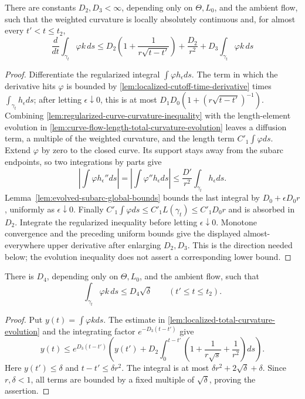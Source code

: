 \begin{theorem}
\label{lem:localized-total-curvature-evolution}
\notready
There are constants $D_2,D_3<\infty$, depending only on
$\Theta,L_0$, and the ambient flow, such that the weighted curvature is
locally absolutely continuous and, for almost every $t' < t\le t_2$,
\[
 \frac d{dt}\int_{\gamma_t}\varphi k\,ds
 \le D_2\left(1+\frac1{r\sqrt{t-t'}}\right)+\frac{D_2}{r^2}
       +D_3\int_{\gamma_t}\varphi k\,ds
\]
\end{theorem}
\begin{proof}
Differentiate the regularized integral
$\int\varphi h_\epsilon ds$.  The term in which the derivative hits
$\varphi$ is bounded by \ref{lem:localized-cutoff-time-derivative} times
$\int_{\gamma_t}h_\epsilon ds$; after letting $\epsilon\downarrow0$, this
is at most $D_1D_0(1+(r\sqrt{t-t'})^{-1})$.  Combining
\ref{lem:regularized-curve-curvature-inequality} with the length-element
evolution in \ref{lem:curve-flow-length-total-curvature-evolution} leaves a
diffusion term, a multiple of the weighted curvature, and the length term
$C'_1\int\varphi ds$.  Extend $\varphi$ by zero to the closed curve.  Its
support stays away from the subarc endpoints, so two integrations by parts
give
\[
 \left|\int\varphi h_\epsilon''ds\right|
 =\left|\int\varphi''h_\epsilon ds\right|
 \le\frac{D'}{r^2}\int_{\gamma_t}h_\epsilon ds.
\]
Lemma~\ref{lem:evolved-subarc-global-bounds} bounds the last integral by
$D_0+\epsilon D_0r$, uniformly as $\epsilon\downarrow0$.  Finally
$C'_1\int\varphi ds\le C'_1L(\gamma_t)\le C'_1D_0r$ and is absorbed in
$D_2$.  Integrate the regularized inequality before letting
$\epsilon\downarrow0$.  Monotone convergence and the preceding uniform bounds
give the displayed almost-everywhere upper derivative after enlarging
$D_2,D_3$.  This is the direction needed below; the evolution inequality does
not assert a corresponding lower bound.
\end{proof}

\begin{theorem}
\label{lem:localized-total-curvature-smallness}
\notready
There is $D_4$, depending only on $\Theta,L_0$, and the ambient flow, such
that
\[
 \int_{\gamma_t}\varphi k\,ds\le D_4\sqrt\delta
 \qquad(t'\le t\le t_2).
\]
\end{theorem}
\begin{proof}
Put $y(t)=\int\varphi kds$.  The estimate in
\ref{lem:localized-total-curvature-evolution} and the integrating
factor $e^{-D_3(t-t')}$ give
\[
 y(t)\le e^{D_3(t-t')}
 \left(y(t')+D_2\int_0^{t-t'}
   \left(1+\frac1{r\sqrt s}+\frac1{r^2}\right)ds\right).
\]
Here $y(t')\le\delta$ and $t-t'\le\delta r^2$.  The integral is at most
$\delta r^2+2\sqrt\delta+\delta$.  Since $r,\delta<1$, all terms are bounded
by a fixed multiple of $\sqrt\delta$, proving the assertion.
\end{proof}

